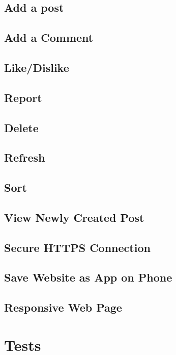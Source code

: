 \documentclass[12pt]{article}
\begin{document}
\subsection{Add a post}

\subsection{Add a Comment}

\subsection{Like/Dislike}

\subsection{Report}

\subsection{Delete}

\subsection{Refresh}

\subsection{Sort}

\subsection{View Newly Created Post}

\subsection{Secure HTTPS Connection}

\subsection{Save Website as App on Phone}

\subsection{Responsive Web Page}

\section{Tests}
\end{document}
